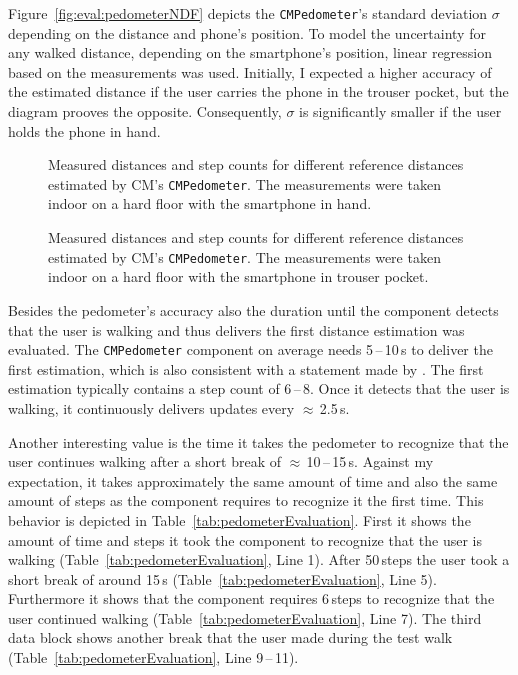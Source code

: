 Figure~\ref{fig:eval:pedometerNDF} depicts the \texttt{CMPedometer}'s standard deviation $\sigma$ depending on the distance and phone's position. To model the uncertainty for any walked distance, depending on the smartphone's position, linear regression based on the measurements was used. Initially, I expected a higher accuracy of the estimated distance if the user carries the phone in the trouser pocket, but the diagram prooves the opposite. Consequently, $\sigma$ is significantly smaller if the user holds the phone in hand.

\begin{figure}[p]
      
	\caption{Measured distances and step counts for different reference distances estimated by \ac{CM}'s \texttt{CMPedometer}. The measurements were taken indoor on a hard floor with the smartphone in hand.}
	\label{fig:eval:pedometerHand}
\end{figure}

\begin{figure}[p]
  
  \caption{Measured distances and step counts for different reference distances estimated by \ac{CM}'s \texttt{CMPedometer}. The measurements were taken indoor on a hard floor with the smartphone in trouser pocket.}
  \label{fig:eval:pedometerPocket}
\end{figure}

Besides the pedometer's accuracy also the duration until the component detects that the user is walking and thus delivers the first distance estimation was evaluated. The \texttt{CMPedometer} component on average needs 5\,--\,10\,s to deliver the first estimation, which is also consistent with a statement made by \citet{apple:wwdc_2014_pham}. The first estimation typically contains a step count of 6\,--\,8. Once it detects that the user is walking, it continuously delivers updates every $\approx$\,2.5\,s.

Another interesting value is the time it takes the pedometer to recognize that the user continues walking after a short break of $\approx$\,10\,--\,15\,s. Against my expectation, it takes approximately the same amount of time and also the same amount of steps as the component requires to recognize it the first time. This behavior is depicted in Table~\ref{tab:pedometerEvaluation}. First it shows the amount of time and steps it took the component to recognize that the user is walking (Table~\ref{tab:pedometerEvaluation}, Line 1). After 50\,steps the user took a short break of around 15\,s (Table~\ref{tab:pedometerEvaluation}, Line 5). Furthermore it shows that the component requires 6\,steps to recognize that the user continued walking (Table~\ref{tab:pedometerEvaluation}, Line 7). The third data block shows another break that the user made during the test walk (Table~\ref{tab:pedometerEvaluation}, Line 9\,--\,11).


